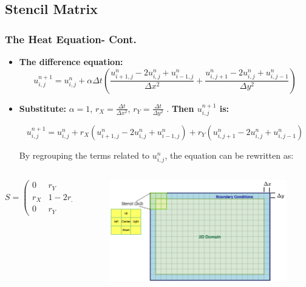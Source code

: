 \documentclass[9pt]{beamer}
\begin{document}
\subsection{Stencil Matrix}
\begin{frame}
\vspace{-0.1\baselineskip} %

\frametitle{The Heat Equation- Cont.}
\scriptsize
\begin{itemize}
\item \textbf{The difference equation:}
\[
u_{i,j}^{n+1} = u_{i,j}^n + \alpha \Delta t \left( \frac{u_{i+1,j}^n - 2u_{i,j}^n + u_{i-1,j}^n}{\Delta x^2} + \frac{u_{i,j+1}^n - 2u_{i,j}^n + u_{i,j-1}^n}{\Delta y^2} \right)
\]
\item \textbf{Substitute:}
\vspace{0.3\baselineskip}
 \( \alpha = 1 \), \( r_X = \frac{\Delta t}{\Delta x^2} \), \( r_Y = \frac{\Delta t}{\Delta y^2} \) . \textbf{Then \( u_{i,j}^{n+1} \) is:}

\[
u_{i,j}^{n+1} = u_{i,j}^n + r_X \left( u_{i+1,j}^n - 2u_{i,j}^n + u_{i-1,j}^n \right) + r_Y \left( u_{i,j+1}^n - 2u_{i,j}^n + u_{i,j-1}^n \right)
\]

By regrouping the terms related to \( u_{i,j}^n \), the equation can be rewritten as:
\end{itemize}
\vspace{-0.7\baselineskip}
\begin{columns}
\begin{column}{0.40\textwidth}
\[
S= \begin{pmatrix}
0   & r_{Y}   & 0 \\
r_{X}  & 1 - 2r_{X} - 2r_{Y}  & r_{X} \\
0   & r_{Y}   & 0
\end{pmatrix}
\]
\end{column}

\begin{column}{0.60\textwidth}
\begin{figure}
    \centering
    \includegraphics[width=0.90\linewidth, height=0.50\linewidth]{Screenshot from 2024-09-30 14-37-35.png}
\end{figure}
\end{column}
\end{columns}
\end{frame}
\end{document}
